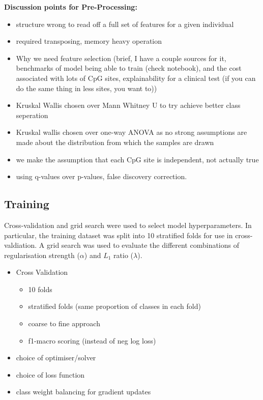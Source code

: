 \documentclass{article}
\begin{document}
\vspace{1cm}
\textbf{Discussion points for Pre-Processing:}
\begin{itemize}
    \item structure wrong to read off a full set of features for a given individual
    \item required transposing, memory heavy operation
    \item Why we need feature selection (brief, I have a couple sources for it, benchmarks of model being able to train (check notebook), and the cost associated with lots of CpG sites, explainability for a clinical test (if you can do the same thing in less sites, you want to))
    \item Kruskal Wallis chosen over Mann Whitney U to try achieve better class seperation
    \item Kruskal wallis chosen over one-way ANOVA as no strong assumptions are made about the distribution from which the samples are drawn
    \item we make the assumption that each CpG site is independent, not actually true
    \item using q-values over p-values, false discovery correction.
\end{itemize}

\subsection{Training} \label{sec:training}

Cross-validation and grid search were used to select model hyperparameters. In particular, the training dataset was split into 10 stratified folds for use in cross-valdiation. A grid search was used to evaluate the different combinations of regularisation strength (\(\alpha\)) and \(L_1\) ratio (\(\lambda\)).

\cite{scikit-learn}
\begin{itemize}
    \item Cross Validation
          \begin{itemize}
              \item 10 folds
              \item stratified folds (same proportion of classes in each fold)
              \item coarse to fine approach
              \item f1-macro scoring (instead of neg log loss)
          \end{itemize}
    \item choice of optimiser/solver
    \item choice of loss function
    \item class weight balancing for gradient updates

\end{itemize}
\end{document}
